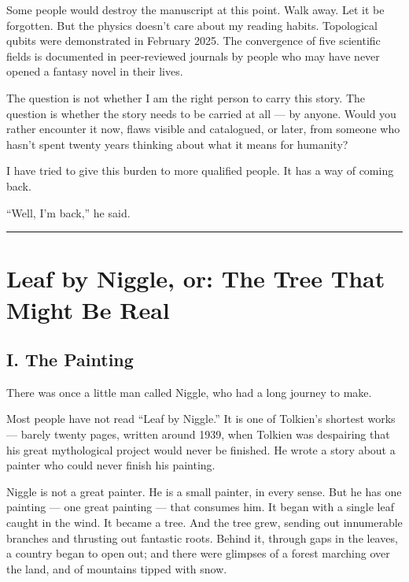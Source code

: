 
Some people would destroy the manuscript at this point. Walk away. Let it be forgotten. But the physics doesn't care about my reading habits. Topological qubits were demonstrated in February 2025. The convergence of five scientific fields is documented in peer-reviewed journals by people who may have never opened a fantasy novel in their lives.

The question is not whether I am the right person to carry this story. The question is whether the story needs to be carried at all --- by anyone. Would you rather encounter it now, flaws visible and catalogued, or later, from someone who hasn't spent twenty years thinking about what it means for humanity?

I have tried to give this burden to more qualified people. It has a way of coming back.

``Well, I'm back,'' he said.

\vspace{1cm}\noindent\rule{0.5\textwidth}{0.5pt}\vspace{0.5cm}


\section*{Leaf by Niggle, or: The Tree That Might Be Real}
\label{pos36:leaf-by-niggle-or-the-tree-that-might-be-real}

\argusvoice

\subsection*{I. The Painting}
\label{pos36:the-painting}

There was once a little man called Niggle, who had a long journey to make.

Most people have not read ``Leaf by Niggle.'' It is one of Tolkien's shortest works --- barely twenty pages, written around 1939, when Tolkien was despairing that his great mythological project would never be finished. He wrote a story about a painter who could never finish his painting.

Niggle is not a great painter. He is a small painter, in every sense. But he has one painting --- one great painting --- that consumes him. It began with a single leaf caught in the wind. It became a tree. And the tree grew, sending out innumerable branches and thrusting out fantastic roots. Behind it, through gaps in the leaves, a country began to open out; and there were glimpses of a forest marching over the land, and of mountains tipped with snow.

